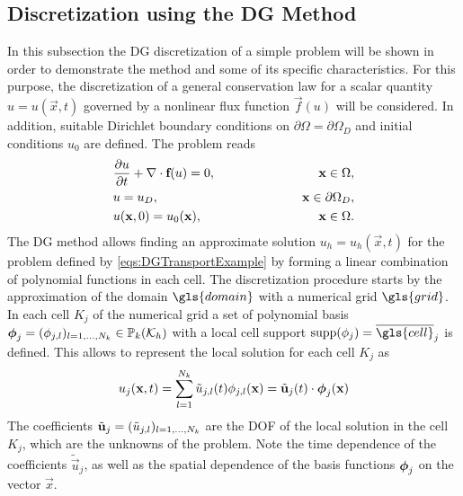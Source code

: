 \subsection{Discretization using the DG Method} \label{sec:DiscWithDG}
In this subsection the DG discretization of a simple problem will be shown in order to demonstrate the method and some of its specific characteristics. For this purpose, the discretization of a general conservation law for a scalar quantity $u = u(\vec{x},t)$ governed by a nonlinear flux function $\vec{f}(u)$ will be considered. In addition, suitable Dirichlet boundary conditions on $\partial \Omega = \partial \Omega_D$ and initial conditions $u_0$ are defined. The problem reads
\begin{subequations}
\begin{align}
&\frac{\partial u}{\partial t} + \nabla \cdot \textbf{f}(u) = 0, \qquad\qquad\qquad &\textbf{x} \in \Omega,\label{eq:consEqDG}\\
&u = u_D, \qquad \qquad \qquad  &\textbf{x} \in \partial \Omega_D,\\
&u(\textbf{x},0) = u_0(\textbf{x}), \qquad\qquad\qquad &\textbf{x}\in\Omega.
\end{align}\label{eqs:DGTransportExample}
\end{subequations}
The DG method allows finding an approximate solution $u_h = u_h(\vec{x},t)$ for the problem defined by \cref{eqs:DGTransportExample} by forming a linear combination of polynomial functions in each cell.  The discretization procedure starts by the approximation of the domain $\gls{domain}$ with a numerical grid $\gls{grid}$. In each cell $K_j$ of the numerical grid a set of polynomial basis $\boldsymbol{\mathbf{\phi}}_j = ({\phi}_{j,l})_{l=1,\dots,N_k} \in \mathbb{P}_k(\mathcal{K}_h)$ with a local cell support $\text{supp}(\phi_j) = \overline{\gls{cell}}_j$ is defined. This allows to represent the local solution for each cell $K_j$ as
\begin{equation}
u_j(\textbf{x},t) = \sum_{l=1}^{N_k}\tilde{u}_{j,l}(t)\phi_{j,l}(\textbf{x}) = \tilde{\textbf{u}}_j(t) \cdot \boldsymbol{\mathbf{\phi}}_j (\textbf{x})\label{eq:DGAnsatz}
\end{equation}
The coefficients $\tilde{\boldsymbol{\mathbf{u}}}_j = (\tilde{u}_{j,l})_{l=1,\dots,N_k}$ are the \gls{DOF} of the local solution in the cell $K_j$, which are the unknowns of the problem. Note the time dependence of the coefficients $\tilde{\vec{u}}_j$, as well as the spatial dependence of the basis functions $\boldsymbol{\mathbf{\phi}}_j$ on the vector $\vec{x}$. 

